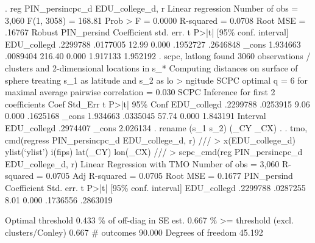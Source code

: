. reg PIN_persincpc_d EDU_college_d, r
{\smallskip}
Linear regression                               Number of obs     =      3,060
                                                F(1, 3058)        =     168.81
                                                Prob > F          =     0.0000
                                                R-squared         =     0.0708
                                                Root MSE          =     .16767
{\smallskip}
             {\VBAR}               Robust
PIN_persin{\tytilde}d {\VBAR} Coefficient  std. err.      t    P>|t|     [95\% conf. interval]
EDU_colleg{\tytilde}d {\VBAR}   .2299788   .0177005    12.99   0.000     .1952727    .2646848
       _cons {\VBAR}   1.934663   .0089404   216.40   0.000     1.917133    1.952192
{\smallskip}
. scpc, latlong
found 3060 observations / clusters and 2-dimensional locations in s_*
Computing distances on surface of sphere treating s_1 as latitude and s_2 as lo
> ngitude
SCPC optimal q = 6 for maximal average pairwise correlation = 0.030
{\smallskip}
SCPC Inference for first 2 coefficients
{\smallskip}
               {\VBAR}      Coef     Std_Err     t      P>|t|    95\% Conf 
  EDU_colleg{\tytilde}d {\VBAR}  .2299788    .0253915    9.06    0.000    .1625168 
         _cons {\VBAR}  1.934663    .0335045   57.74    0.000    1.843191 
{\smallskip}
               {\VBAR}  Interval  
  EDU_colleg{\tytilde}d {\VBAR}  .2974407  
         _cons {\VBAR}  2.026134  
{\smallskip}
. rename (s_1 s_2) (_CY _CX)
{\smallskip}
. 
. tmo, cmd(regress PIN_persincpc_d EDU_college_d, r) ///
>     x(EDU_college_d) ylist(`ylist') i(fips) lat(_CY) lon(_CX) ///
>     scpc_cmd(reg PIN_persincpc_d EDU_college_d, r)
{\smallskip}
Linear Regression with TMO                              Number of obs =  3,060
                                                        R-squared     = 0.0705
                                                        Adj R-squared = 0.0705
                                                        Root MSE      = 0.1677
{\smallskip}
PIN_persin{\tytilde}d {\VBAR} Coefficient  Std. err.      t    P>|t|     [95\% conf. interval]
EDU_colleg{\tytilde}d {\VBAR}   .2299788   .0287255     8.01   0.000     .1736556    .2863019
                                                                               
                                                   Optimal threshold      0.433
                                            \% of off-diag in SE est.      0.667
                              \% >= threshold (excl. clusters/Conley)      0.667
                                                          \# outcomes     90.000
                                                  Degrees of freedom     45.192
